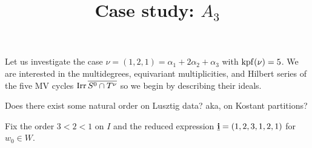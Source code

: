 \documentclass[11pt]{article}
\title{Case study: $A_3$}
\begin{document}
\maketitle
%
Let us investigate the case $\nu = (1,2,1) = \alpha_1 + 2\alpha_2 + \alpha_3$ with $\operatorname{kpf}(\nu) = 5$. We are interested in the multidegrees, equivariant multiplicities, and Hilbert series of the five MV cycles $\operatorname{Irr}\overline{S^0\cap T^\nu}$ so we begin by describing their ideals.

\begin{question}
    Does there exist some natural order on Lusztig data? aka, on Kostant partitions? 
\end{question}

\noindent Fix the order $3 < 2 < 1$ on $I$ and the reduced expression $\underline{\mathbf{i}} = (1,2,3,1,2,1)$ for $w_0\in W$. 
\end{document}
